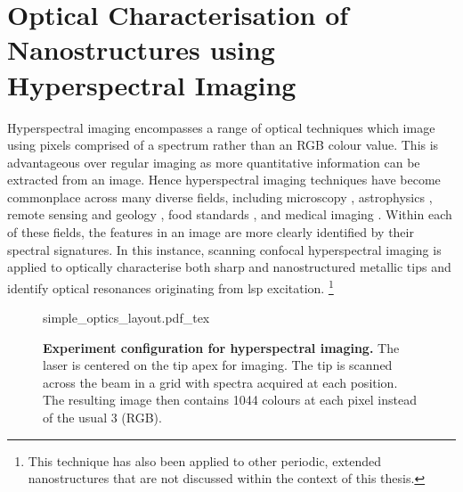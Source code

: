 \documentclass{article}
\begin{document}
\section{Optical Characterisation of Nanostructures using Hyperspectral Imaging}
\label{sec:hyperspectral_imaging}

Hyperspectral imaging encompasses a range of optical techniques which image using pixels comprised of a spectrum rather than an RGB colour value. This is advantageous over regular imaging as more quantitative information can be extracted from an image. Hence hyperspectral imaging techniques have become commonplace across many diverse fields, including microscopy \cite{schultz2001hyperspectral, leavesley2012hyperspectral}, astrophysics \cite{hege2004hyperspectral}, remote sensing and geology \cite{hackwell1996lwir, shaw2003spectral}, food standards \cite{kim2001hyperspectral, gowen2007hyperspectral}, and medical imaging \cite{vo2004hyperspectral, martin2006development, lu2014medical}. Within each of these fields, the features in an image are more clearly identified by their spectral signatures. In this instance, scanning confocal hyperspectral imaging is applied to optically characterise both sharp and nanostructured metallic tips and identify optical resonances originating from \gls{lsp} excitation.%
\footnote{This technique has also been applied to other periodic, extended nanostructures that are not discussed within the context of this thesis.} %

\begin{figure}[bt]
\centering
\fontsize{10pt}{1em}\selectfont
\def\svgwidth{0.6\textwidth}
{simple_optics_layout.pdf_tex}
\caption[Experiment configuration for hyperspectral imaging]{\textbf{Experiment configuration for hyperspectral imaging.} The laser is centered on the tip apex for imaging. The tip is scanned across the beam in a grid with spectra acquired at each position. The resulting image then contains 1044 colours at each pixel instead of the usual 3 (RGB).}
\label{fig:simple_optics_layout}
\end{figure}
\end{document}
